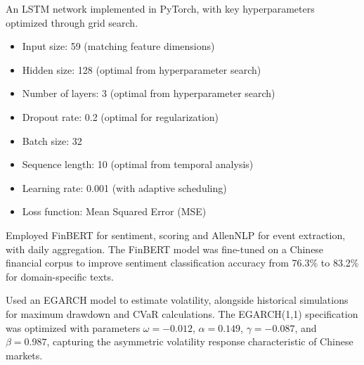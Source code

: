 \documentclass[3p,times,procedia]{elsarticle}
\begin{document}
 An LSTM network implemented in PyTorch,
with key hyperparameters optimized through grid search.
\begin{itemize}
    \item Input size: 59 (matching feature dimensions)
\item Hidden size: 128 (optimal from hyperparameter search)
\item Number of layers: 3 (optimal from hyperparameter search)
\item Dropout rate: 0.2 (optimal for regularization)
\item Batch size: 32
\item Sequence length: 10 (optimal from temporal analysis)
\item Learning rate: 0.001 (with adaptive scheduling)
\item Loss function: Mean Squared Error (MSE)
\end{itemize}

 Employed FinBERT for \allowbreak sentiment, scoring and AllenNLP for event extraction, with daily aggregation. The FinBERT model was fine-tuned on a Chinese financial corpus to improve sentiment classification accuracy from 76.3\% to 83.2\% for domain-specific texts.

 Used an EGARCH model to estimate volatility, alongside historical simulations for maximum drawdown and CVaR calculations. The EGARCH(1,1) specification was optimized with parameters $\omega = -0.012$, $\alpha = 0.149$, $\gamma = -0.087$, and $\beta = 0.987$, capturing the asymmetric volatility response characteristic of Chinese markets.
\end{document}
